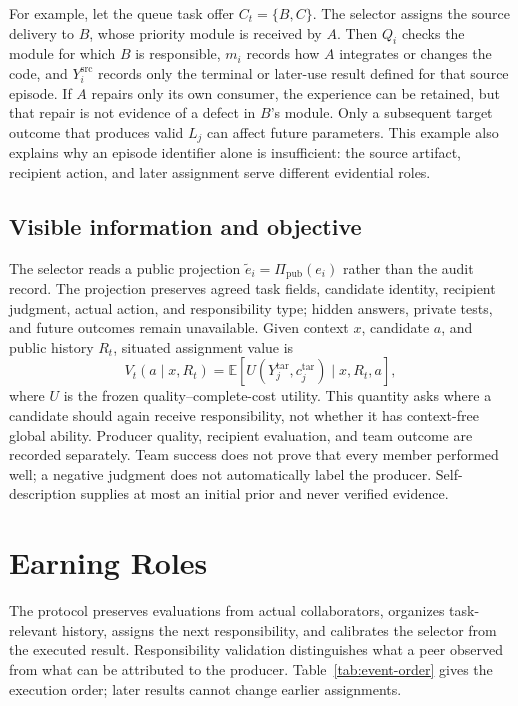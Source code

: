 \documentclass[sigconf,anonymous]{aamas}
\begin{document}
For example, let the queue task offer $C_t=\{B,C\}$. The selector assigns the source delivery to $B$, whose priority module is received by $A$. Then $Q_i$ checks the module for which $B$ is responsible, $m_i$ records how $A$ integrates or changes the code, and $Y_i^{\mathrm{src}}$ records only the terminal or later-use result defined for that source episode. If $A$ repairs only its own consumer, the experience can be retained, but that repair is not evidence of a defect in $B$'s module. Only a subsequent target outcome that produces valid $L_j$ can affect future parameters. This example also explains why an episode identifier alone is insufficient: the source artifact, recipient action, and later assignment serve different evidential roles.

\subsection{Visible information and objective}
The selector reads a public projection $\tilde e_i=\Pi_{\mathrm{pub}}(e_i)$ rather than the audit record. The projection preserves agreed task fields, candidate identity, recipient judgment, actual action, and responsibility type; hidden answers, private tests, and future outcomes remain unavailable. Given context $x$, candidate $a$, and public history $R_t$, situated assignment value is
\begin{equation}
 V_t(a\mid x,R_t)=\mathbb{E}[U(Y_j^{\mathrm{tar}},c_j^{\mathrm{tar}})\mid x,R_t,a],
\label{eq:value}
\end{equation}
where $U$ is the frozen quality--complete-cost utility. This quantity asks where a candidate should again receive responsibility, not whether it has context-free global ability. Producer quality, recipient evaluation, and team outcome are recorded separately. Team success does not prove that every member performed well; a negative judgment does not automatically label the producer. Self-description supplies at most an initial prior and never verified evidence.

\section{Earning Roles}
\label{sec:method}
The protocol preserves evaluations from actual collaborators, organizes task-relevant history, assigns the next responsibility, and calibrates the selector from the executed result. Responsibility validation distinguishes what a peer observed from what can be attributed to the producer. Table~\ref{tab:event-order} gives the execution order; later results cannot change earlier assignments.
\end{document}
